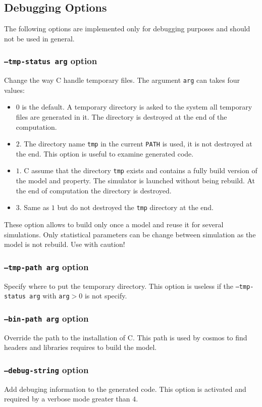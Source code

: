 \documentclass{article}
\newcommand{\cosmos}{\mbox{\textup{C}\scalebox{0.75}{{\textsc{OSMOS}}}}}
\begin{document}
\subsection{Debugging Options}
The following options are implemented only for debugging purposes and
should not be used in general.

\subsubsection{\texttt{--tmp-status arg} option}
Change the way \cosmos{} handle temporary files. The argument \texttt{arg}
can takes four values: 
\begin{itemize}
\item $0$ is the default. A temporary directory is asked to the system
  all temporary files are generated in it. The directory is destroyed
  at the end of the computation.
\item $2$. The directory name \texttt{tmp} in the current
  \texttt{PATH} is used, it is not destroyed at the end. This option
  is useful to examine generated code.
\item $1$. \cosmos{} assume that the directory \texttt{tmp} exists
  and contains a fully build version of the model and property. The
  simulator is launched without being rebuild. At the end of computation
  the directory is destroyed.
\item $3$. Same as $1$ but do not destroyed the \texttt{tmp} directory
  at the end.
\end{itemize}
These option allows to build only once a model and reuse it for
several simulations. Only statistical parameters can be change between simulation
as the model is not rebuild. Use with caution!

\subsubsection{\texttt{--tmp-path arg} option}
Specify where to put the temporary directory. This option is useless
if the \texttt{--tmp-status arg} with \texttt{arg}$>0$ is not specify.

\subsubsection{\texttt{--bin-path arg} option}
Override the path to the installation of \cosmos{}. This path is used
by cosmos to find headers and libraries requires to build the model.

\subsubsection{\texttt{--debug-string} option}
Add debuging information to the generated code. This option is activated
and required by a verbose mode greater than $4$.
\end{document}
